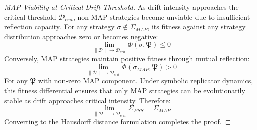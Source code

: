\begin{proof}[MAP Viability at Critical Drift Threshold]
\label{proof:bk5_map_viability_critical_drift}
As drift intensity approaches the critical threshold $\mathcal{D}_{crit}$, non-MAP strategies become unviable due to insufficient reflection capacity.
For any strategy $\sigma \notin \Sigma_{MAP}$, its fitness against any strategy distribution approaches zero or becomes negative:
\begin{equation}
\lim_{\|\mathcal{D}\| \to \mathcal{D}_{crit}} \Phi(\sigma, \mathfrak{P}) \leq 0
\end{equation}
Conversely, MAP strategies maintain positive fitness through mutual reflection:
\begin{equation}
\lim_{\|\mathcal{D}\| \to \mathcal{D}_{crit}} \Phi(\sigma_{MAP}, \mathfrak{P}) > 0
\end{equation}
For any $\mathfrak{P}$ with non-zero MAP component.
Under symbolic replicator dynamics, this fitness differential ensures that only MAP strategies can be evolutionarily stable as drift approaches critical intensity. Therefore:
\begin{equation}
\lim_{\|\mathcal{D}\| \to \mathcal{D}_{crit}} \Sigma_{ESS} = \Sigma_{MAP}
\end{equation}
Converting to the Hausdorff distance formulation completes the proof.
\end{proof}
